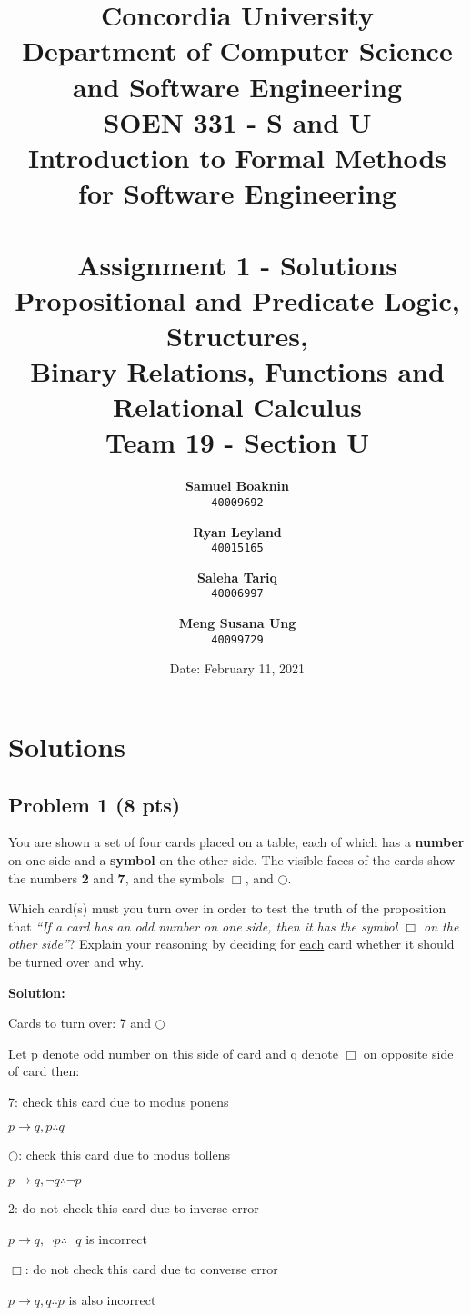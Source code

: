 \documentclass[12pt]{article}
\title{Concordia University\\
Department of Computer Science and Software Engineering\\
\textbf{SOEN 331 - S and U\\Introduction to Formal Methods\\for Software Engineering}\\
\ \\
\textbf{Assignment 1 - Solutions}\\
Propositional and Predicate Logic, Structures,\\Binary Relations, Functions and Relational Calculus\\
\textbf{Team 19 - Section U}}
\author{
	\textbf{Samuel Boaknin}\\
	\texttt{40009692}
	\and
	\textbf{Ryan Leyland}\\
	\texttt{40015165}
	\and
	\textbf{Saleha Tariq}\\
	\texttt{40006997}
	\and
	\textbf{Meng Susana Ung}\\
	\texttt{40099729}
}
\date{Date: February 11, 2021}
\begin{document}
\maketitle

\newpage
\tableofcontents
\newpage

\section{Solutions}

\subsection{Problem 1 (8 pts)}

\noindent You are shown a set of four cards placed on a table, each of which has a \textbf{number} on one side and a \textbf{symbol} on the other side. The visible faces of the cards show the numbers \textbf{2} and \textbf{7}, and the symbols \textbf{$\Box$}, and \textbf{$\bigcirc$}.

\bigskip
\noindent Which card(s) must you turn over in order to test the truth of the proposition that \textit{``If a card has an odd number on one side, then it has the symbol $\Box$ on the other side''}? Explain your reasoning by deciding for \underline{each} card whether it should be turned over and why.

\bigskip

\noindent \textbf{Solution:}

\noindent Cards to turn over: 7 and \textbf{$\bigcirc$}

\noindent Let p denote odd number on this side of card and q denote \textbf{$\Box$} on opposite side of card then:

7: check this card due to modus ponens

\indent \indent $p \rightarrow q, p \therefore q$

\textbf{$\bigcirc$}: check this card due to modus tollens

\indent \indent $p \rightarrow q, \neg q \therefore \neg p$

2: do not check this card due to inverse error

\indent \indent $p \rightarrow q, \neg p \therefore \neg q$ is incorrect

\textbf{$\Box$}: do not check this card due to converse error

\indent \indent $p \rightarrow q, q \therefore p$ is also incorrect


\newpage
\end{document}
